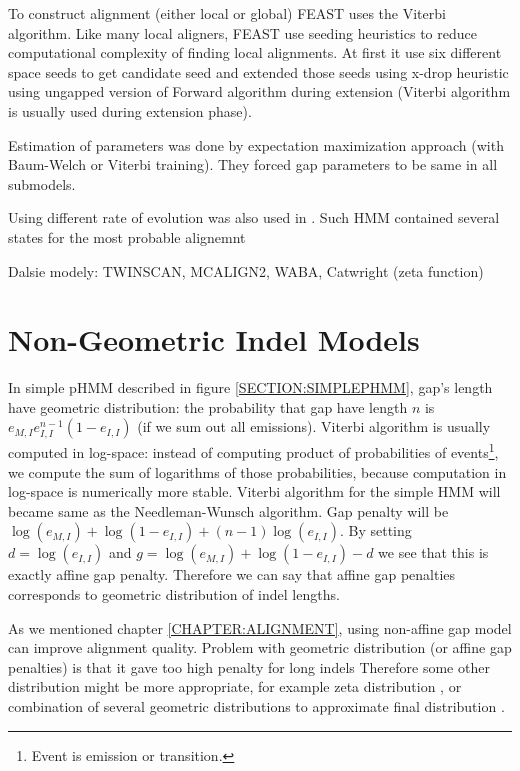 To construct alignment (either local or global) FEAST uses the Viterbi
algorithm. Like many local aligners, FEAST use seeding heuristics to reduce
computational complexity of finding local alignments.  At first it use six
different space seeds to get candidate seed and extended those seeds using
x-drop heuristic \cite{} using ungapped version of Forward algorithm during
extension (Viterbi algorithm is usually used during extension phase).

Estimation of parameters was done by expectation maximization approach (with
Baum-Welch or Viterbi training). They forced gap parameters to be same in all
submodels.

Using different rate of evolution was also used in \cite{NovyLunter}. Such HMM
contained several states for the most probable alignemnt

Dalsie modely: TWINSCAN, MCALIGN2, WABA, Catwright (zeta function)

\section{Non-Geometric Indel Models}
In simple pHMM described in figure \ref{SECTION:SIMPLEPHMM}, gap's length have
geometric distribution: the probability that gap have length $n$ is
$e_{M,I}e_{I,I}^{n-1}(1-e_{I,I})$ (if we sum out all emissions).  Viterbi
algorithm is usually computed in log-space: instead of computing product of
probabilities of events\footnote{Event is emission or transition.}, we compute
the sum of logarithms of those probabilities, because computation in log-space
is numerically more stable. Viterbi algorithm for the simple HMM
will became same as the Needleman-Wunsch algorithm.  Gap penalty will be
$\log(e_{M,I})+\log(1-e_{I,I})+(n-1)\log(e_{I,I})$. By setting $d=\log(e_{I,I})$
and $g=\log(e_{M,I})+\log(1-e_{I,I})-d$ we see that this is exactly affine gap
penalty. Therefore we can say that affine gap penalties corresponds to geometric
distribution of indel lengths.

As we mentioned chapter \ref{CHAPTER:ALIGNMENT}, using non-affine gap model can
improve alignment quality.  Problem with geometric distribution (or affine gap
penalties) is that it gave too high penalty for long indels \cite{} Therefore
some other distribution might be more appropriate, for example zeta distribution
\cite{}, or combination of several geometric distributions to approximate final
distribution \cite{}.


